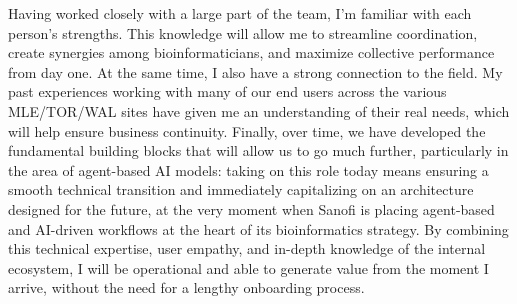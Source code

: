 \documentclass[11pt, a4paper]{awesome-cv}
\begin{document}
\begin{cvletter}
Having worked closely with a large part of the team, I'm familiar with each person’s strengths. This knowledge will allow me to streamline coordination, create synergies among bioinformaticians, and maximize collective performance from day one. At the same time, I also have a strong connection to the field. My past experiences working with many of our end users across the various MLE/TOR/WAL sites have given me an understanding of their real needs, which will help ensure business continuity. Finally, over time, we have developed the fundamental building blocks that will allow us to go much further, particularly in the area of agent-based AI models: taking on this role today means ensuring a smooth technical transition and immediately capitalizing on an architecture designed for the future, at the very moment when Sanofi is placing agent-based and AI-driven workflows at the heart of its bioinformatics strategy.
By combining this technical expertise, user empathy, and in-depth knowledge of the internal ecosystem, I will be operational and able to generate value from the moment I arrive, without the need for a lengthy onboarding process.




\end{cvletter}


\makeletterclosing
\end{document}
